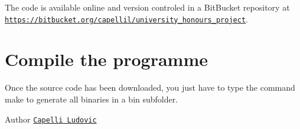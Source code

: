 The code is available online and version controled in a Bit\+Bucket repository at \href{https://bitbucket.org/capellil/university_honours_project}{\tt https\+://bitbucket.\+org/capellil/university\+\_\+honours\+\_\+project}. \hypertarget{index_Compile_Section}{}\section{Compile the programme}\label{index_Compile_Section}
Once the source code has been downloaded, you just have to type the command \textquotesingle{}make\textquotesingle{} to generate all binaries in a bin subfolder. \begin{DoxyAuthor}{Author}
\href{https://uk.linkedin.com/in/lcapelli}{\tt Capelli Ludovic} 
\end{DoxyAuthor}
